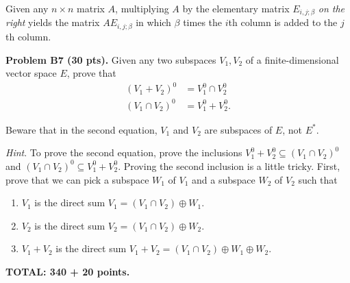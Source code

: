 \documentclass[12pt]{article}
\begin{document}
\hint
Given any $n\times n$ matrix $A$, 
multiplying $A$ by the elementary matrix
$E_{i, j; \beta}$ {\it on the right\/} yields
the matrix $AE_{i, j; \beta}$ in which $\beta$ times the  $i$th column is
added to the $j$th column.



\vspace {0.25cm}\noindent
{\bf Problem B7 (30 pts).}
Given any two subspaces $V_1, V_2$ of a finite-dimensional
vector space $E$,
prove that
\begin{align*}
(V_1 + V_2)^{0} & = V_1^0\cap V_2^0 \\
(V_1 \cap V_2)^{0}& = V_1^0 +  V_2^0.
\end{align*}

Beware that in the second equation, $V_1$ and $V_2$ are subspaces of
$E$, not $E^*$.

\medskip\noindent
{\it Hint\/}. To prove the second equation, prove the inclusions
$V_1^0 +  V_2^0 \subseteq (V_1 \cap V_2)^{0}$ and
$(V_1 \cap V_2)^{0} \subseteq  V_1^0 +  V_2^0$.
Proving the second inclusion is a little tricky. First, prove that
we can pick a subspace $W_1$ of $V_1$ and a
subspace $W_2$ of $V_2$ such that 
\begin{enumerate}
\item
$V_1$ is the direct sum
$V_1 = (V_1\cap V_2) \oplus W_1$.
\item 
$V_2$ is the direct sum
$V_2 = (V_1\cap V_2) \oplus W_2$.
\item
$V_1 + V_2$ is the direct sum
$V_1 + V_2 = (V_1 \cap V_2) \oplus W_1\oplus W_2$.
\end{enumerate}



\vspace{0.5cm}\noindent
{\bf TOTAL: 340 + 20  points.}
\end{document}
